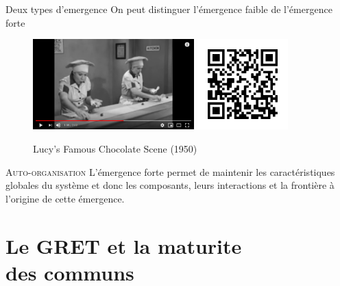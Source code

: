 \documentclass[newPxFont]{beamer}
\begin{document}
\begin{frame}[c]{Deux types d'emergence}
\vspace{-1cm}
On peut distinguer l’émergence faible de l’émergence forte

\begin{figure}
  \includegraphics[height=3.5cm]{img/Screenshot_2019-11-18 (143) Lucy's Famous Chocolate Scene - YouTube}
  \includegraphics[height=3.5cm]{img/qrcode_lucy.png}
  \caption{Lucy's Famous Chocolate Scene (1950)}
\end{figure}

\small{
  \begin{alertblock}{\textsc{Auto-organisation}}
      L'émergence forte permet de maintenir les caractéristiques globales du système et donc les composants, leurs interactions et la frontière à l’origine de cette émergence.
  \end{alertblock}
}

\end{frame}


\section{Le GRET et la maturite \\
            des communs}
\end{document}
